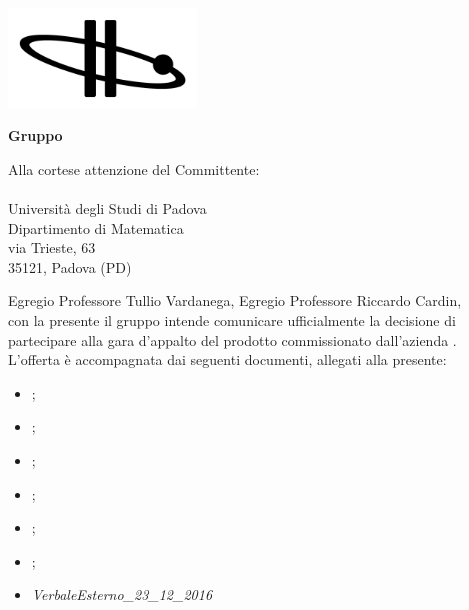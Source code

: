   
	\begin{titlepage}
	
	\begin{center}
	 	
	\includegraphics[width=5cm]{../../modello/or-bit_bkg_minBorder.png} 
	\begin{Huge} 
	 	\textbf{Gruppo \GroupName{}}
	\end{Huge}
	\end{center}
	
	\vspace{0.5cm}
	\begin{large}
	\begin{flushright}
		Alla cortese attenzione del Committente: \\
		\Committente \\
		Università degli Studi di Padova \\
		Dipartimento di Matematica \\
		via Trieste, 63 \\
		35121, Padova (PD) 
		
		
	
	\end{flushright}

	\vspace{0.5cm}
	
	Egregio Professore Tullio Vardanega,
	Egregio Professore Riccardo Cardin, \\
	con la presente il gruppo \GroupName{} intende comunicare ufficialmente la decisione di partecipare alla gara d'appalto del prodotto \ProjectName{} commissionato dall'azienda \Proponente{}.\\
	
	
	L'offerta è accompagnata dai seguenti documenti, allegati alla presente:
	\begin{itemize}
		\item \AnalisiDeiRequisiti{};
		\item \Glossario{};
		\item \NormeDiProgetto{};
		\item \PianoDiProgetto{};
		\item \PianoDiQualifica{};
		\item \StudioDiFattibilita{};
		\item \emph{VerbaleEsterno\_23\_12\_2016}
	\end{itemize}
	

\end{large}
\end{titlepage}
